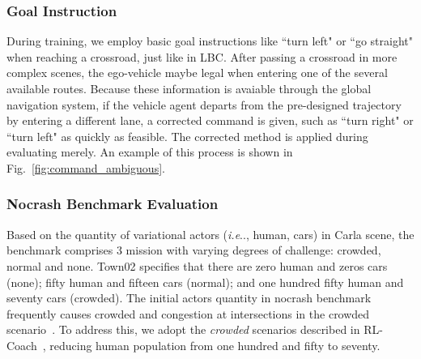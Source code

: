 \documentclass[preprint,12pt]{elsarticle}
\makeatletter
\DeclareRobustCommand\onedot{\futurelet\@let@token\@onedot}
\def\@onedot{\ifx\@let@token.\else.\null\fi\xspace}
\def\ie{\emph{i.e}\onedot} \def\Ie{\emph{I.e}\onedot}
\makeatother
\begin{document}
\subsubsection{Goal Instruction} 
\hspace{1pc}During training, we employ basic goal instructions like ``turn left" or ``go straight" when reaching a crossroad, just like in LBC\cite{Codevilla:2019}.
After passing a crossroad in more complex scenes, the ego-vehicle maybe legal when entering one of the several available routes. 
Because these information is avaiable through the global navigation system, if the vehicle agent departs from the pre-designed trajectory by entering a different lane, a corrected command is given, such as ``turn right" or ``turn left" as quickly as feasible. 
The corrected method is applied during evaluating merely.
An example of this process is shown in Fig.~\ref{fig:command_ambiguous}.


\subsubsection{Nocrash Benchmark Evaluation}\label{nocrash_metrics}

\hspace{1pc}Based on the quantity of variational actors ({\ie}, human, cars) in Carla scene, the benchmark comprises 3 mission with varying degrees of challenge: crowded, normal and none.
Town02 specifies that there are zero human and zeros cars (none); fifty human and fifteen cars (normal); and one hundred fifty human and seventy cars (crowded).
%
The initial actors quantity in nocrash benchmark frequently causes crowded and congestion at intersections in the crowded scenario~\cite{Zhang:2021}.
To address this, we adopt the \emph{crowded} scenarios described in RL-Coach~\cite{Zhang:2021}, reducing human population from one hundred and fifty to seventy. 
\end{document}
